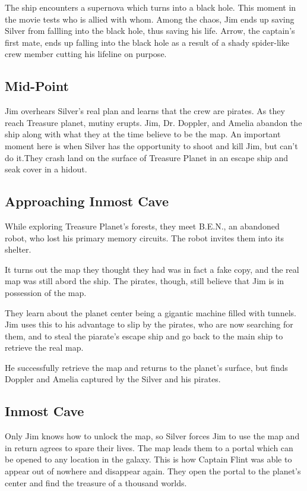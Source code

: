 \documentclass[notitlepage]{fhnwreport}
\begin{document}
\begin{multicols}{2}
The ship encounters a supernova which turns into a black  hole. This moment in
the movie tests who is allied with whom.  Among  the chaos, Jim ends up saving
Silver from fallling into the  black  hole,  thus  saving his life. Arrow, the
captain's first mate, ends up  falling  into  the  black hole as a result of a
shady spider-like crew member cutting his lifeline on purpose.

\subsection*{Mid-Point}

Jim overhears Silver's real plan and learns that the crew are pirates. As they
reach Treasure planet, mutiny erupts. Jim, Dr. Doppler, and Amelia abandon the
ship  along  with  what  they at the time believe to be the map. An  important
moment  here  is  when Silver has the opportunity to shoot and kill  Jim,  but
can't  do it.They crash land on the surface of Treasure Planet  in  an  escape
ship and seak cover in a hidout.

\subsection*{Approaching Inmost Cave}

While exploring Treasure Planet's  forests,  they  meet  B.E.N.,  an abandoned
robot,  who  lost his primary memory circuits. The robot invites them into its
shelter.

It turns out the map they thought they had was in  fact  a  fake copy, and the
real map was still abord the ship. The pirates, though, still believe that Jim
is in possession of the map.

They  learn  about  the  planet  center  being a gigantic machine filled  with
tunnels. Jim uses this  to  his  advantage to slip by the pirates, who are now
searching for them, and to steal the piarate's escape  ship and go back to the
main ship to retrieve the real map.

He successfully  retrieve  the  map  and  returns to the planet's surface, but
finds   Doppler  and  Amelia  captured  by  the  Silver   and   his   pirates.

\subsection*{Inmost Cave}

Only Jim  knows how to unlock the map, so Silver forces Jim to use the map and
in return agrees to spare their lives. The map leads  them  to  a portal which
can  be  opened to any location in the galaxy. This is how Captain  Flint  was
able to appear out of nowhere and disappear again. They open the portal to the
planet's center and find the treasure of a thousand worlds.


\end{multicols}
\end{document}
